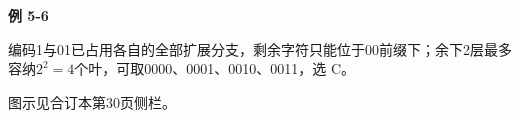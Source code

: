 {\color{ink}\bfseries 例 5-6}\par\vspace{1bp}编码1与01已占用各自的全部扩展分支，剩余字符只能位于00前缀下；余下2层最多容纳\(2^{2}=\allowbreak{}4\)个叶，可取0000、0001、0010、0011，选 C。\par {\color{ink}图示见合订本第30页侧栏。}
